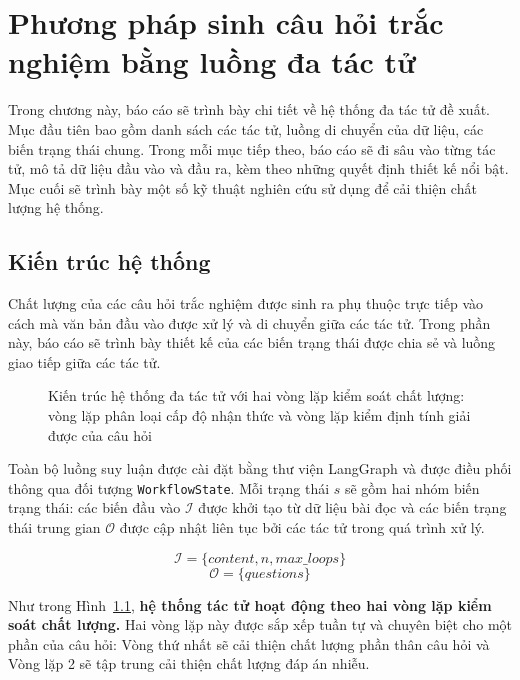 \chapter{Phương pháp sinh câu hỏi trắc nghiệm bằng luồng đa tác tử}
\label{chap:phuong-phap}

Trong chương này, báo cáo sẽ trình bày chi tiết về hệ thống đa tác tử đề xuất. Mục đầu tiên bao gồm danh sách các tác tử, luồng di chuyển của dữ liệu, các biến trạng thái chung. Trong mỗi mục tiếp theo, báo cáo sẽ đi sâu vào từng tác tử, mô tả dữ liệu đầu vào và đầu ra, kèm theo những quyết định thiết kế nổi bật. Mục cuối sẽ trình bày một số kỹ thuật nghiên cứu sử dụng để cải thiện chất lượng hệ thống.

\section{Kiến trúc hệ thống}
\label{sec:da-tac-tu}

Chất lượng của các câu hỏi trắc nghiệm được sinh ra phụ thuộc trực tiếp vào cách mà văn bản đầu vào được xử lý và di chuyển giữa các tác tử. Trong phần này, báo cáo sẽ trình bày thiết kế của các biến trạng thái được chia sẻ và luồng giao tiếp giữa các tác tử.

\begin{figure}[htbp]
    \centering
    \resizebox{\textwidth}{!}{}
    \caption{Kiến trúc hệ thống đa tác tử với hai vòng lặp kiểm soát chất lượng: vòng lặp phân loại cấp độ nhận thức và vòng lặp kiểm định tính giải được của câu hỏi}
    \label{fig:multiagent-architecture}
\end{figure}

Toàn bộ luồng suy luận được cài đặt bằng thư viện LangGraph \cite{langgraph2024} và được điều phối thông qua đối tượng \texttt{WorkflowState}. Mỗi trạng thái $s$ sẽ gồm hai nhóm biến trạng thái: các biến đầu vào $\mathcal{I}$ được khởi tạo từ dữ liệu bài đọc và các biến trạng thái trung gian $\mathcal{O}$ được cập nhật liên tục bởi các tác tử trong quá trình xử lý.

\begin{equation}
\mathcal{I} = \{\textit{content}, \textit{n}, \textit{max\_loops}\}
\end{equation}
\begin{equation}
\mathcal{O} = \{\textit{questions}\}
\end{equation}

Như trong Hình~\ref{fig:multiagent-architecture}, \textbf{hệ thống tác tử hoạt động theo hai vòng lặp kiểm soát chất lượng.} Hai vòng lặp này được sắp xếp tuần tự và chuyên biệt cho một phần của câu hỏi: Vòng thứ nhất sẽ cải thiện chất lượng phần thân câu hỏi và Vòng lặp 2 sẽ tập trung cải thiện chất lượng đáp án nhiễu.

